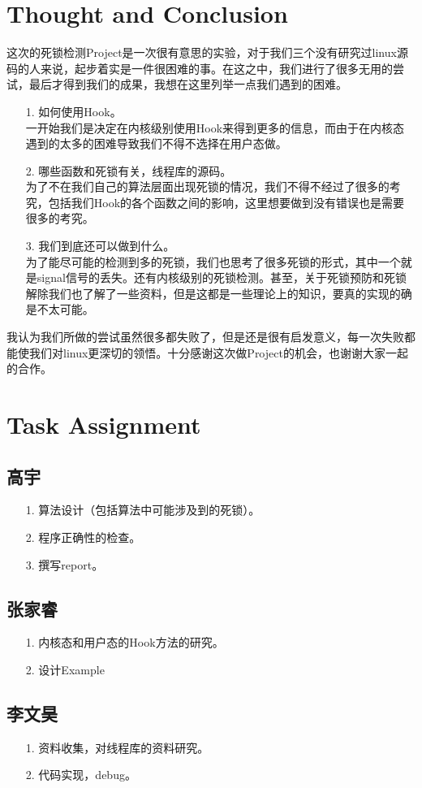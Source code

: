 \documentclass[titlepage]{article}
\begin{document}
\section{Thought and Conclusion}
\indent 这次的死锁检测Project是一次很有意思的实验，对于我们三个没有研究过linux源码的人来说，起步着实是一件很困难的事。在这之中，我们进行了很多无用的尝试，最后才得到我们的成果，我想在这里列举一点我们遇到的困难。
\begin{itemize}
	\item[1.] 如何使用Hook。\\
一开始我们是决定在内核级别使用Hook来得到更多的信息，而由于在内核态遇到的太多的困难导致我们不得不选择在用户态做。
	\item[2.] 哪些函数和死锁有关，线程库的源码。\\
为了不在我们自己的算法层面出现死锁的情况，我们不得不经过了很多的考究，包括我们Hook的各个函数之间的影响，这里想要做到没有错误也是需要很多的考究。
	\item[3.] 我们到底还可以做到什么。\\
为了能尽可能的检测到多的死锁，我们也思考了很多死锁的形式，其中一个就是signal信号的丢失。还有内核级别的死锁检测。甚至，关于死锁预防和死锁解除我们也了解了一些资料，但是这都是一些理论上的知识，要真的实现的确是不太可能。
\end{itemize}
\indent 我认为我们所做的尝试虽然很多都失败了，但是还是很有启发意义，每一次失败都能使我们对linux更深切的领悟。十分感谢这次做Project的机会，也谢谢大家一起的合作。


\section{Task Assignment}

\subsection{高宇}
\begin{itemize}
	\item[1.] 算法设计（包括算法中可能涉及到的死锁）。
	\item[2.] 程序正确性的检查。
	\item[3.] 撰写report。
\end{itemize}

\subsection{张家睿}
\begin{itemize}
	\item[1.] 内核态和用户态的Hook方法的研究。
	\item[2.] 设计Example
\end{itemize}

\subsection{李文昊}
\begin{itemize}
	\item[1.] 资料收集，对线程库的资料研究。
	\item[2.] 代码实现，debug。
\end{itemize}
\end{document}
